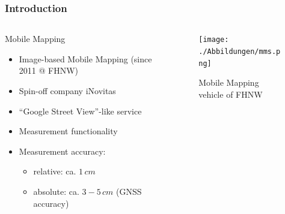 \documentclass[aspectratio=169]{beamer}
\begin{document}
  \begin{frame}
   \frametitle{Introduction}
   \begin{columns}[onlytextwidth]

    \begin{column}{0.5\textwidth}
    Mobile Mapping
      \begin{itemize}
       \item Image-based Mobile Mapping \newline(since 2011 @ FHNW)
       \item Spin-off company iNovitas
       \item ``Google Street View''-like service
       \item Measurement functionality
       \item Measurement accuracy:
       \begin{itemize}
        \item relative: ca. $1\, cm$
        \item absolute: ca. $3-5\, cm$ \newline(GNSS accuracy)
       \end{itemize}
      \end{itemize}
    \end{column}
    \begin{column}{0.5\textwidth}
    
     \begin{figure}[h]
       \centering
       \texttt{[image: ./Abbildungen/mms.png]}
       \caption{Mobile Mapping vehicle of FHNW}
       \label{abb:mms}
     \end{figure}
     
    \end{column}
    
   \end{columns}
  \end{frame}
\end{document}
